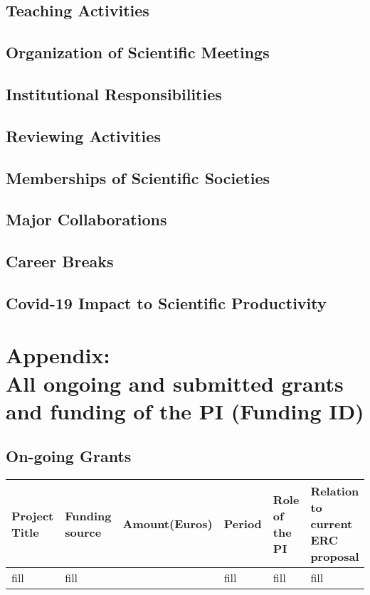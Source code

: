 \documentclass[STG]{ercgrant}
\begin{document}
\subsection{Teaching Activities}
\subsection{Organization of Scientific Meetings}
\subsection{Institutional Responsibilities}
\subsection{Reviewing Activities}
\subsection{Memberships of Scientific Societies}
\subsection{Major Collaborations}
\subsection{Career Breaks}
\subsection{Covid-19 Impact to Scientific Productivity}

\newpage
\section*{Appendix:\\ All ongoing and submitted grants and funding of the PI (Funding ID)}
\subsection{On-going Grants}
\color{red}
\begin{footnotesize}
	\def\arraystretch{1.5}
	\begin{tabular}{|p{3.9cm}|p{2.5cm}|p{1.4cm}|p{}|p{1.6cm}|p{1.8cm}|}
		\hline
		\rowcolor{black!20}
		\textbf{Project Title}         &
		\textbf{Funding source}        &
		\textbf{Amount\newline(Euros)} &
		\textbf{Period}                &
		\textbf{Role of the PI}        &
		\textbf{Relation to \newline current ERC \newline proposal}          \\
		\hline
		fill                           & fill & \EUR{1} & fill & fill & fill \\
		\hline
	\end{tabular}
\end{footnotesize}
\color{black}
\end{document}
